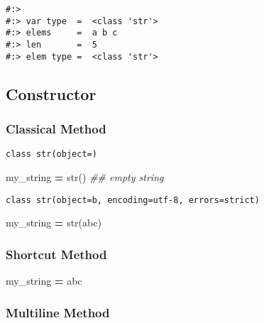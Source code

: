 \documentclass[
]{book}
\newenvironment{Shaded}{\begin{snugshade}}{\end{snugshade}}
\newcommand{\BuiltInTok}[1]{#1}
\newcommand{\CommentTok}[1]{\textcolor[rgb]{0.37,0.37,0.37}{\textit{#1}}}
\newcommand{\NormalTok}[1]{#1}
\newcommand{\OperatorTok}[1]{\textcolor[rgb]{0.43,0.43,0.43}{\textbf{#1}}}
\newcommand{\StringTok}[1]{\textcolor[rgb]{0.5,0.5,0.5}{#1}}
\begin{document}
\begin{verbatim}
#:> 
#:> var type  =  <class 'str'> 
#:> elems     =  a b c 
#:> len       =  5 
#:> elem type =  <class 'str'>
\end{verbatim}

\hypertarget{constructor}{%
\subsection{Constructor}\label{constructor}}

\hypertarget{classical-method}{%
\subsubsection{Classical Method}\label{classical-method}}

\texttt{class\ str(object=\textquotesingle{}\textquotesingle{})}

\begin{Shaded}
\begin{Highlighting}[]
\NormalTok{my\_string }\OperatorTok{=} \BuiltInTok{str}\NormalTok{()        }\CommentTok{\#\# empty string}
\end{Highlighting}
\end{Shaded}

\texttt{class\ str(object=b\textquotesingle{}\textquotesingle{},\ encoding=\textquotesingle{}utf-8\textquotesingle{},\ errors=\textquotesingle{}strict\textquotesingle{})}

\begin{Shaded}
\begin{Highlighting}[]
\NormalTok{my\_string }\OperatorTok{=} \BuiltInTok{str}\NormalTok{(}\StringTok{\textquotesingle{}abc\textquotesingle{}}\NormalTok{)}
\end{Highlighting}
\end{Shaded}

\hypertarget{shortcut-method}{%
\subsubsection{Shortcut Method}\label{shortcut-method}}

\begin{Shaded}
\begin{Highlighting}[]
\NormalTok{my\_string }\OperatorTok{=} \StringTok{\textquotesingle{}abc\textquotesingle{}}
\end{Highlighting}
\end{Shaded}

\hypertarget{multiline-method}{%
\subsubsection{Multiline Method}\label{multiline-method}}
\end{document}
